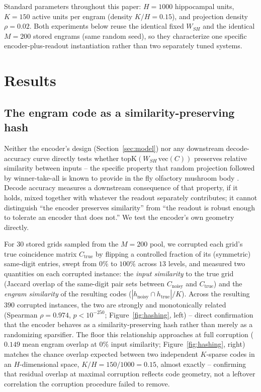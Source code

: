 \documentclass[11pt]{article}
\begin{document}
Standard parameters throughout this paper: $H=1000$ hippocampal units, $K=150$ active units per
engram (density $K/H=0.15$), and projection density $\rho=0.02$. Both experiments below reuse
the identical fixed $W_{SH}$ and the identical $M=200$ stored engrams (same random seed), so
they characterize one specific encoder-plus-readout instantiation rather than two separately
tuned systems.

\section{Results}

\subsection{The engram code as a similarity-preserving hash}
\label{sec:hashing}

Neither the encoder's design (Section~\ref{sec:model}) nor any downstream decode-accuracy
curve directly tests whether $\mathrm{topK}(W_{SH}\,\mathrm{vec}(C))$ preserves relative
similarity between inputs -- the specific property that random projection followed by
winner-take-all is known to provide in the fly olfactory mushroom body
\cite{dasgupta2017}. Decode accuracy measures a downstream consequence of that property, if it
holds, mixed together with whatever the readout separately contributes; it cannot distinguish
``the encoder preserves similarity'' from ``the readout is robust enough to tolerate an encoder
that does not.'' We test the encoder's own geometry directly.

For $30$ stored grids sampled from the $M=200$ pool, we corrupted each grid's true coincidence
matrix $C_{\mathrm{true}}$ by flipping a controlled fraction of its (symmetric) same-digit
entries, swept from $0\%$ to $100\%$ across $13$ levels, and measured two quantities on each
corrupted instance: the \emph{input similarity} to the true grid (Jaccard overlap of the
same-digit pair sets between $C_{\mathrm{noisy}}$ and $C_{\mathrm{true}}$) and the \emph{engram
similarity} of the resulting codes ($|h_{\mathrm{noisy}}\cap h_{\mathrm{true}}|/K$). Across the
resulting $390$ corrupted instances, the two are strongly and monotonically related (Spearman
$\rho=0.974$, $p<10^{-250}$; Figure~\ref{fig:hashing}, left) -- direct confirmation that the
encoder behaves as a similarity-preserving hash rather than merely as a randomizing sparsifier.
The floor this relationship approaches at full corruption ($0.149$ mean engram overlap at
$0\%$ input similarity; Figure~\ref{fig:hashing}, right) matches the chance overlap expected
between two independent $K$-sparse codes in an $H$-dimensional space, $K/H = 150/1000 = 0.15$,
almost exactly -- confirming that residual overlap at maximal corruption reflects code
geometry, not a leftover correlation the corruption procedure failed to remove.
\end{document}
